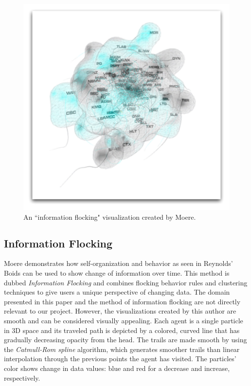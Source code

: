 \documentclass[conference]{IEEEtran}
\begin{document}
\begin{figure}
\centering
\includegraphics[scale=.4]{images/blob.pdf}
\caption{An ``information flocking" visualization created by Moere\cite{1382896}.}
\label{Blob}
\end{figure}

\subsection{Information Flocking}
Moere demonstrates how self-organization and behavior as seen in Reynolds' Boids can be used to show change of information over time\cite{1382896}. This method is dubbed {\em Information Flocking} and combines flocking behavior rules and clustering techniques to give users a unique perspective of changing data.
The domain presented in this paper and the method of information flocking are not directly relevant to our project.
However, the visualizations created by this author are smooth and can be considered visually appealing.
Each agent is a single particle in 3D space and its traveled path is depicted by a colored,
curved line that has gradually decreasing opacity from the head.
The trails are made smooth by using the {\em Catmull-Rom spline} algorithm,
which generates smoother trails than linear interpolation through the previous points the agent has visited.
The particles' color shows change in data values: blue and red for a decrease and increase, respectively.
\end{document}
